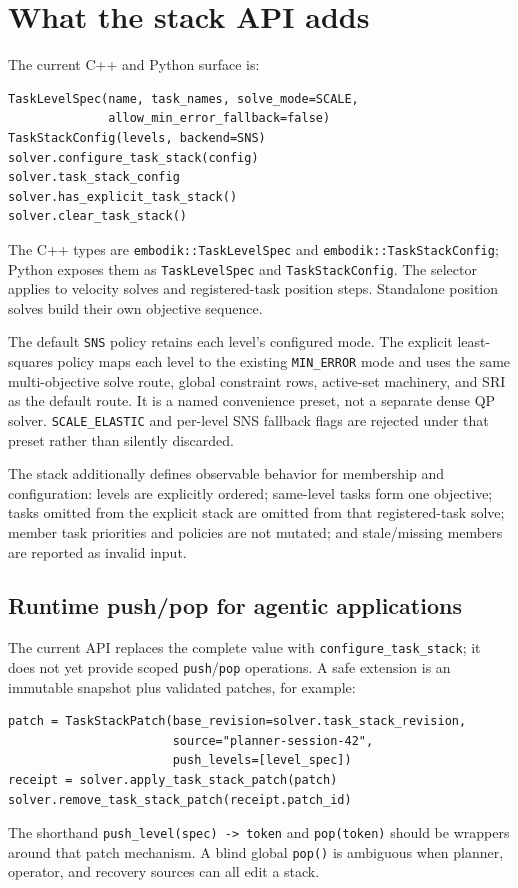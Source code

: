 \documentclass[11pt]{article}
\begin{document}
\section{What the stack API adds}

The current C++ and Python surface is:
\begin{verbatim}
TaskLevelSpec(name, task_names, solve_mode=SCALE,
              allow_min_error_fallback=false)
TaskStackConfig(levels, backend=SNS)
solver.configure_task_stack(config)
solver.task_stack_config
solver.has_explicit_task_stack()
solver.clear_task_stack()
\end{verbatim}

The C++ types are \texttt{embodik::TaskLevelSpec} and
\texttt{embodik::TaskStackConfig}; Python exposes them as
\texttt{TaskLevelSpec} and \texttt{TaskStackConfig}. The selector applies to
velocity solves and registered-task position steps. Standalone position
solves build their own objective sequence.

The default \texttt{SNS} policy retains each level's configured mode. The
explicit least-squares policy maps each level to the existing \texttt{MIN\_ERROR}
mode and uses the same multi-objective solve route, global constraint rows,
active-set machinery, and SRI as the default route. It is a named convenience
preset, not a separate dense QP solver. \texttt{SCALE\_ELASTIC}
and per-level SNS fallback flags are rejected under that preset rather than
silently discarded.

The stack additionally defines observable behavior for membership and
configuration: levels are explicitly ordered; same-level tasks form one
objective; tasks omitted from the explicit stack are omitted from that
registered-task solve; member task priorities and policies are not mutated;
and stale/missing members are reported as invalid input.

\subsection{Runtime push/pop for agentic applications}

The current API replaces the complete value with
\texttt{configure\_task\_stack}; it does not yet provide scoped
\texttt{push}/\texttt{pop} operations. A safe extension is an immutable
snapshot plus validated patches, for example:
\begin{verbatim}
patch = TaskStackPatch(base_revision=solver.task_stack_revision,
                       source="planner-session-42",
                       push_levels=[level_spec])
receipt = solver.apply_task_stack_patch(patch)
solver.remove_task_stack_patch(receipt.patch_id)
\end{verbatim}
The shorthand \texttt{push\_level(spec) -> token} and \texttt{pop(token)}
should be wrappers around that patch mechanism. A blind global \texttt{pop()}
is ambiguous when planner, operator, and recovery sources can all edit a
stack.
\end{document}
